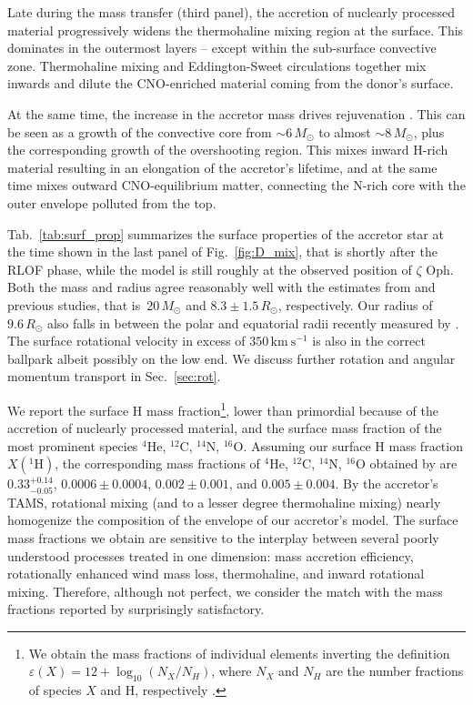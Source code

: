 \documentclass[twocolumn,twocolappendix,trackchanges]{aastex63}
\newcommand{\kms}{{\mathrm{km\ s^{-1}}}}
\DeclareRobustCommand{\Figref}[1]{Fig.~\ref{#1}}
\DeclareRobustCommand{\Tabref}[1]{Tab.~\ref{#1}}
\DeclareRobustCommand{\Secref}[1]{Sec.~\ref{#1}}
\newcommand{\zoph}{$\zeta$ Oph}
\begin{document}
Late during the mass transfer (third panel), the accretion of
nuclearly processed material progressively widens the thermohaline
mixing region at the surface.  This dominates in the outermost layers
-- except within the sub-surface convective zone. Thermohaline mixing
and Eddington-Sweet circulations together mix inwards and dilute the
CNO-enriched material coming from the donor's surface.

At the same time, the increase in the accretor mass drives
rejuvenation \citep[e.g.,][]{schneider:16}. This can be seen as a
growth of the convective core from
$\sim$$6\,M_\odot$ to almost $\sim$$8\,M_\odot$, plus the
corresponding growth of the overshooting region. This mixes inward
H-rich material resulting in an elongation of the accretor's lifetime,
and at the same time mixes outward CNO-equilibrium matter, connecting
the N-rich core with the outer envelope polluted from the top.



\Tabref{tab:surf_prop} summarizes the surface properties of the
accretor star at the time shown in the last panel of
\Figref{fig:D_mix}, that is shortly after the RLOF phase, while the
model is still roughly at the observed position of \zoph. Both the
mass and radius agree reasonably well with the estimates from
 and previous studies, that is~$20\,M_\odot$
and $8.3\pm1.5\,R_\odot$, respectively. Our radius of $9.6\,R_\odot$
also falls in between the polar and equatorial radii recently measured
by \cite{gordon:18}. The surface rotational velocity in excess of
$350\,\kms$ is also in the correct ballpark albeit possibly on the low
end. We discuss further rotation and angular momentum transport in
\Secref{sec:rot}.

We report the surface H mass fraction\footnote{We obtain the mass
  fractions of individual elements inverting the definition
  $\varepsilon(X)=12+\log_{10}(N_X/N_H)$, where $N_X$ and $N_H$ are
  the number fractions of species $X$ and H, respectively \citep[e.g.,][]{lodders:19}.}, lower
than primordial because of the accretion of nuclearly processed
material, and the surface mass fraction of the most prominent species
$^4\mathrm{He}$, $^{12}\mathrm{C}$, $^{14}\mathrm{N}$,
$^{16}\mathrm{O}$.  Assuming our surface H mass fraction
$X(^1\mathrm{H})$, the corresponding mass fractions of
$^4\mathrm{He}$, $^{12}\mathrm{C}$, $^{14}\mathrm{N}$,
$^{16}\mathrm{O}$ obtained by  are
$0.33^{+0.14}_{-0.05}$, $0.0006\pm0.0004$, $0.002\pm0.001$, and
$0.005\pm0.004$.  By the accretor's TAMS, rotational mixing (and to a
lesser degree thermohaline mixing) nearly homogenize the composition
of the envelope of our accretor's model. The surface mass fractions we obtain are sensitive to
the interplay between several poorly understood processes treated in
one dimension: mass accretion efficiency, rotationally enhanced wind
mass loss, thermohaline, and inward rotational mixing. Therefore,
although not perfect, we consider the match with the mass fractions
reported by  surprisingly satisfactory.
\end{document}
